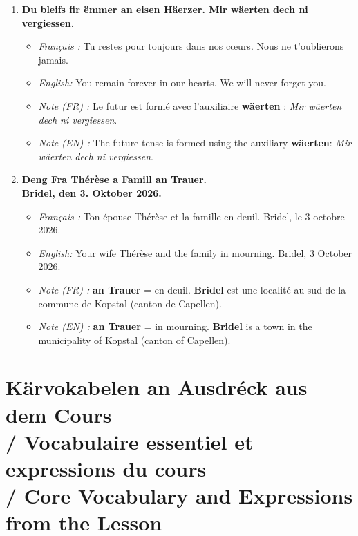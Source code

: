 \begin{enumerate}
    \vspace{0.6em}

    \item \textbf{Du bleifs fir ëmmer an eisen Häerzer. Mir wäerten dech ni vergiessen.}
    \begin{itemize}
        \item \textit{Français :} Tu restes pour toujours dans nos cœurs. Nous ne t'oublierons jamais.
        \item \textit{English:} You remain forever in our hearts. We will never forget you.
        \item \textit{Note (FR) :} Le futur est formé avec l'auxiliaire \textbf{wäerten} : \textit{Mir wäerten dech ni vergiessen}.
        \item \textit{Note (EN) :} The future tense is formed using the auxiliary \textbf{wäerten}: \textit{Mir wäerten dech ni vergiessen}.
    \end{itemize}

    \vspace{0.6em}

    \item \textbf{Deng Fra Thérèse a Famill an Trauer.} \\
    \textbf{Bridel, den 3. Oktober 2026.}
    \begin{itemize}
        \item \textit{Français :} Ton épouse Thérèse et la famille en deuil. Bridel, le 3 octobre 2026.
        \item \textit{English:} Your wife Thérèse and the family in mourning. Bridel, 3 October 2026.
        \item \textit{Note (FR) :} \textbf{an Trauer} = en deuil. \textbf{Bridel} est une localité au sud de la commune de Kopstal (canton de Capellen).
        \item \textit{Note (EN) :} \textbf{an Trauer} = in mourning. \textbf{Bridel} is a town in the municipality of Kopstal (canton of Capellen).
    \end{itemize}
\end{enumerate}

\vspace{1.5em}

\section[Vokabelen an Ausdréck / Vocabulary \& Expressions]{Kärvokabelen an Ausdréck aus dem Cours \\/ Vocabulaire essentiel et expressions du cours \\/ Core Vocabulary and Expressions from the Lesson}

